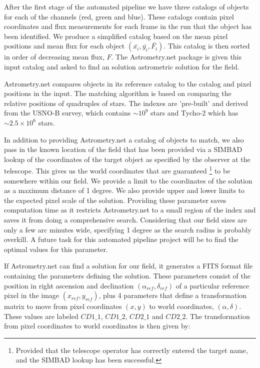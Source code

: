 After the first stage of the automated pipeline we have three catalogs of objects for each of the channels (red, green and blue). These catalogs contain pixel coordinates and flux measurements for each frame in the run that the object has been identified. We produce a simplified catalog based on the mean pixel positions and mean flux for each object $(\bar{x_i}, \bar{y_i}, \bar{F_i})$. This catalog is then sorted in order of decreasing mean flux, $F$. The Astrometry.net package is given this input catalog and asked to find an solution astrometric solution for the field. 

Astrometry.net compares objects in its reference catalog to the catalog and pixel positions in the input. The matching algorithm is based on comparing the relative positions of quadruples of stars. The indexes are 'pre-built' and derived from the USNO-B survey, which contains $\sim10^9$ stars and Tycho-2 which has $\sim2.5\times10^6$ stars. 

In addition to providing Astrometry.net a catalog of objects to match, we also pass in the known location of the field that has been provided via a SIMBAD lookup of the coordinates of the target object as specified by the observer at the telescope. This gives us the world coordinates that are guaranteed \footnote{Provided that the telescope operator has correctly entered the target name, and the SIMBAD lookup has been successful.} to be somewhere within our field. We provide a limit to the coordinates of the solution as a maximum distance of 1 degree. We also provide upper and lower limits to the expected pixel scale of the solution. Providing these parameter saves computation time as it restricts Astrometry.net to a small region of the index and saves it from doing a comprehensive search. Considering that our field sizes are only a few arc minutes wide, specifying 1 degree as the search radius is probably overkill. A future task for this automated pipeline project will be to find the optimal values for this parameter.

If Astrometry.net can find a solution for our field, it generates a FITS format file containing the parameters defining the solution. These parameters consist of the position in right ascension and declination $(\alpha_{ref}, \delta_{ref})$ of a particular reference pixel in the image $(x_{ref}, y_{ref})$, plus 4 parameters that define a transformation matrix to move from pixel coordinates $(x, y)$ to world coordinates, $(\alpha, \delta)$. These values are labeled $CD1\_1$, $CD1\_2$, $CD2\_1$ and $CD2\_2$. The transformation from pixel coordinates to world coordinates is then given by: 

